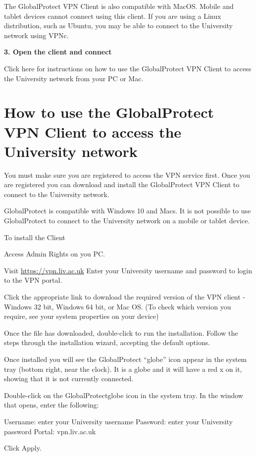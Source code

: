 \documentclass[]{book}
\begin{document}
The GlobalProtect VPN Client is also compatible with MacOS. Mobile and
tablet devices cannot connect using this client. If you are using a
Linux distribution, such as Ubuntu, you may be able to connect to the
University network using VPNc.

\textbf{3. Open the client and connect}

Click here for instructions on how to use the GlobalProtect VPN Client
to access the University network from your PC or Mac.

\section{How to use the GlobalProtect VPN Client to access the
University
network}\label{how-to-use-the-globalprotect-vpn-client-to-access-the-university-network}

You must make sure you are registered to access the VPN service first.
Once you are registered you can download and install the GlobalProtect
VPN Client to connect to the University network.

GlobalProtect is compatible with Windows 10 and Macs. It is not possible
to use GlobalProtect to connect to the University network on a mobile or
tablet device.

To install the Client

Access Admin Rights on you PC.

Visit \url{https://vpn.liv.ac.uk} Enter your University username and
password to login to the VPN portal.

Click the appropriate link to download the required version of the VPN
client - Windows 32 bit, Windows 64 bit, or Mac OS. (To check which
version you require, see your system properties on your device)

Once the file has downloaded, double-click to run the installation.
Follow the steps through the installation wizard, accepting the default
options.

Once installed you will see the GlobalProtect ``globe'' icon appear in
the system tray (bottom right, near the clock). It is a globe and it
will have a red x on it, showing that it is not currently connected.

Double-click on the GlobalProtectglobe icon in the system tray. In the
window that opens, enter the following:

Username: enter your University username Password: enter your University
password Portal: vpn.liv.ac.uk

Click Apply.
\end{document}

